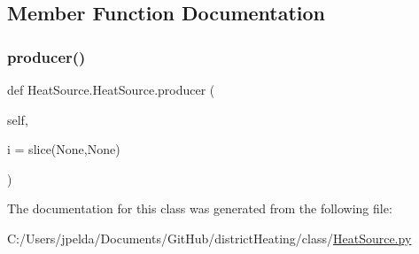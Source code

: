 \subsection{Member Function Documentation}
\mbox{\label{class_heat_source_1_1_heat_source_a2c86ea2252b3a4f0eec9428fc61e14ab}} 
\subsubsection{\texorpdfstring{producer()}{producer()}}
{\footnotesize\ttfamily def Heat\+Source.\+Heat\+Source.\+producer (\begin{DoxyParamCaption}\item[{}]{self,  }\item[{}]{i = {\ttfamily slice(None,None)} }\end{DoxyParamCaption})}



The documentation for this class was generated from the following file\+:\begin{DoxyCompactItemize}
\item 
C\+:/\+Users/jpelda/\+Documents/\+Git\+Hub/district\+Heating/class/\hyperlink{_heat_source_8py}{Heat\+Source.\+py}\end{DoxyCompactItemize}
